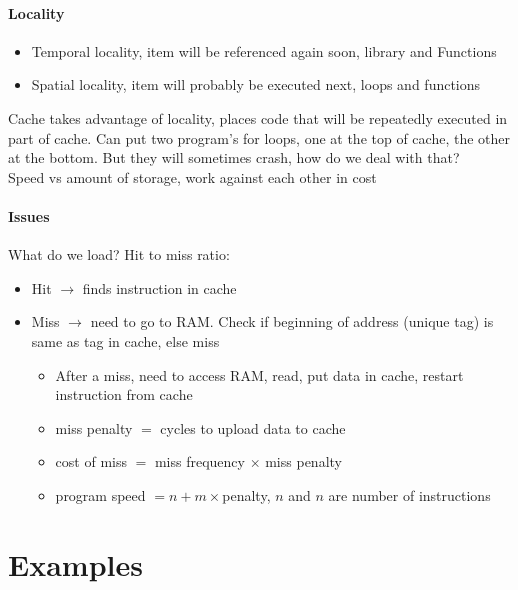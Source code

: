 \documentclass[12 pt]{article}
\begin{document}
\paragraph{Locality}
\begin{itemize}
\item Temporal locality, item will be referenced again soon, library and Functions
\item Spatial locality, item will probably be executed next, loops and functions
\end{itemize}
Cache takes advantage of locality, places code that will be repeatedly executed in part of cache. Can put two program's for loops, one at the top of cache, the other at the bottom. But they will sometimes crash, how do we deal with that?
\\ Speed vs amount of storage, work against each other in cost
\paragraph{Issues} What do we load? Hit to miss ratio:
\begin{itemize}
\item Hit $\to$ finds instruction in cache
\item Miss $\to$ need to go to RAM. Check if beginning of address (unique tag) is same as tag in cache, else miss
\begin{itemize}
\item After a miss, need to access RAM, read, put data in cache, restart instruction from cache
\item miss penalty $=$ cycles to upload data to cache
\item cost of miss $=$ miss frequency $\times$ miss penalty
\item program speed $=n+m\times$penalty, $n$ and $n$ are number of instructions
\end{itemize}
\end{itemize}
\section{Examples}
\end{document}
